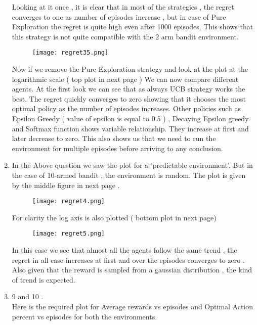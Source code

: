 \documentclass[a4 paper]{article}
\begin{document}
\begin{enumerate}
Looking at it once , it is clear that in most of the strategies , the regret converges to one as number of episodes increase , but in case of Pure Exploration the regret is quite high even after 1000 episodes. This shows that this strategy is not quite compatible with the 2 arm bandit environment.\\

\begin{figure}[h!]
    \centering
    \texttt{[image: regret35.png]}
\end{figure}

Now if we remove the Pure Exploration strategy and look at the plot at the logarithmic scale ( top plot in next page )
We can now compare different agents. At the first look we can see that as always UCB strategy works the best. The regret quickly converges to zero showing that it chooses the most optimal policy as the number of episodes increases. Other policies such as Epsilon Greedy ( value of epsilon is equal to 0.5 ) , Decaying Epsilon greedy and Softmax function shows variable relationship. They increase at first and later decrease to zero. This also shows us that we need to run the environment for multiple episodes before arriving to any conclusion. 


\item In the Above question we saw the plot for a 'predictable environment'. But in the case of 10-armed bandit , the environment is random. The plot is given by the middle figure in next page .

\begin{figure}[h!]
    \centering
    \texttt{[image: regret4.png]}
\end{figure}

 For clarity the log axis is also plotted ( bottom plot in next page)
 
 \begin{figure}[h!]
    \centering
    \texttt{[image: regret5.png]}
\end{figure}
 
 In this case we see that almost all the agents follow the same trend , the regret in all case increases at first and over the episodes converges to zero . Also given that the reward is sampled from a gaussian distribution , the kind of trend is expected.
 
 \item 9 and 10 .\\
 Here is the required plot for Average rewards vs episodes and Optimal Action percent vs episodes for both  the environments.


\end{enumerate}
\end{document}
